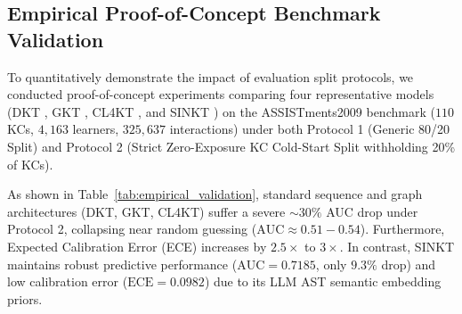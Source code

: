 \documentclass[10pt,journal,compsoc]{IEEEtran}
\begin{document}
\subsection{Empirical Proof-of-Concept Benchmark Validation}
To quantitatively demonstrate the impact of evaluation split protocols, we conducted proof-of-concept experiments comparing four representative models (DKT \cite{Piech_DKT_2015}, GKT \cite{KT004_GKT_2019}, CL4KT \cite{KT039_CL4KT_2022}, and SINKT \cite{KT044_SINKT_2024}) on the ASSISTments2009 benchmark ($110$ KCs, $4,163$ learners, $325,637$ interactions) under both Protocol 1 (Generic 80/20 Split) and Protocol 2 (Strict Zero-Exposure KC Cold-Start Split withholding 20\% of KCs).

As shown in Table~\ref{tab:empirical_validation}, standard sequence and graph architectures (DKT, GKT, CL4KT) suffer a severe $\sim 30\%$ AUC drop under Protocol 2, collapsing near random guessing ($\text{AUC} \approx 0.51 - 0.54$). Furthermore, Expected Calibration Error (ECE) increases by $2.5\times$ to $3\times$. In contrast, SINKT maintains robust predictive performance ($\text{AUC} = 0.7185$, only $9.3\%$ drop) and low calibration error ($\text{ECE} = 0.0982$) due to its LLM AST semantic embedding priors.

\begin{table}[t]
\caption{Empirical Benchmark Validation Proof-of-Concept: Generic 80/20 Split vs. Strict Zero-Exposure KC Cold-Start Split}
\label{tab:empirical_validation}
\centering
{}
\end{table}
\end{document}
